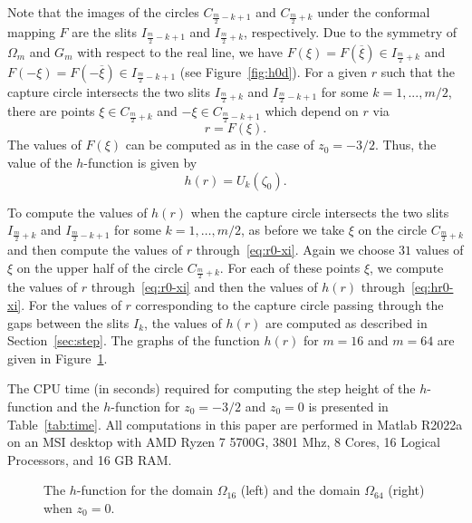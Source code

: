 Note that the images of the circles $C_{\frac{m}{2}-k+1}$ and $C_{\frac{m}{2}+k}$ under the conformal mapping $F$ are the slits $I_{\frac{m}{2}-k+1}$ and $I_{\frac{m}{2}+k}$, respectively. Due to the symmetry of $\Omega_m$ and $G_m$ with respect to the real line, we have $F(\xi)=F(\overline{\xi})\in I_{\frac{m}{2}+k}$ and $F(-\xi)=F(-\overline{\xi})\in I_{\frac{m}{2}-k+1}$ (see Figure~\ref{fig:h0d}).
For a given $r$ such that the capture circle intersects the two slits $I_{\frac{m}{2}+k}$ and $I_{\frac{m}{2}-k+1}$ for some $k=1,...,m/2$, there are points $\xi\in C_{\frac{m}{2}+k}$ and $-\xi\in C_{\frac{m}{2}-k+1}$ which depend on $r$ via 
\begin{equation}\label{eq:r0-xi}
	r= F(\xi).
\end{equation}
The values of $F(\xi)$ can be computed as in the case of $z_0=-3/2$. Thus, the value of the $h$-function is given by
\begin{equation}\label{eq:hr0-xi}
	h(r)=U_k(\zeta_0).
\end{equation}

To compute the values of $h(r)$ when the capture circle intersects the two slits $I_{\frac{m}{2}+k}$ and $I_{\frac{m}{2}-k+1}$ for some $k=1,\ldots,m/2$, as before we take $\xi$ on the circle $C_{\frac{m}{2}+k}$ and then compute the values of $r$ through~\eqref{eq:r0-xi}. 
Again we choose $31$ values of $\xi$ on the upper half of the circle $C_{\frac{m}{2}+k}$. For each of these points $\xi$, we compute the values of $r$ through~\eqref{eq:r0-xi} and then the values of $h(r)$ through~\eqref{eq:hr0-xi}. 
For the values of $r$ corresponding to the capture circle passing through the gaps between the slits $I_k$, the values of $h(r)$ are computed as described in Section~\ref{sec:step}.
The graphs of the function $h(r)$ for $m=16$ and $m=64$ are given in Figure~\ref{fig:h-0}.

The CPU time (in seconds) required for computing the step height of the $h$-function and the $h$-function for $z_0=-3/2$ and $z_0=0$ is presented in Table~\ref{tab:time}. All computations in this paper are performed in {\sc Matlab} R2022a on an MSI desktop with AMD Ryzen 7 5700G, 3801 Mhz, 8 Cores, 16 Logical Processors, and 16 GB RAM. 

\begin{figure}[htb] %
\centerline{
\hfill
{}
}
\caption{The $h$-function for the domain $\Omega_{16}$ (left) and the domain $\Omega_{64}$ (right) when $z_0=0$.}
\label{fig:h-0}
\end{figure}



